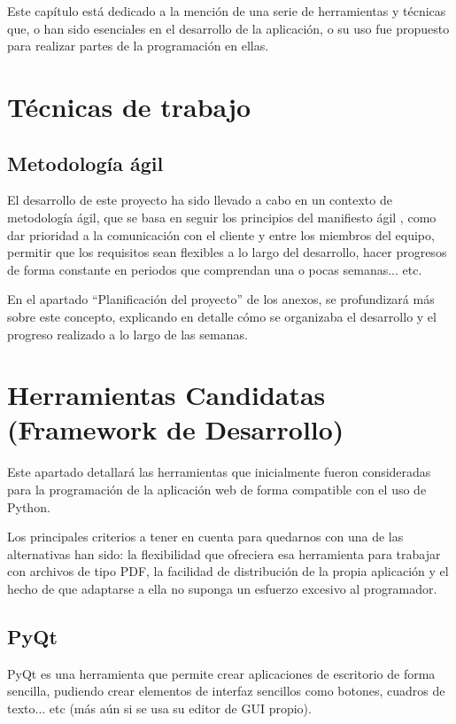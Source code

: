 
Este capítulo está dedicado a la mención de una serie de herramientas y técnicas que, o han sido esenciales en el desarrollo de la aplicación, o su uso fue propuesto para realizar partes de la programación en ellas.

\section{Técnicas de trabajo}

\subsection{Metodología ágil}

El desarrollo de este proyecto ha sido llevado a cabo en un contexto de metodología ágil, que se basa en seguir los principios del manifiesto ágil \cite{fowler2001agile}, como dar prioridad a la comunicación con el cliente y entre los miembros del equipo, permitir que los requisitos sean flexibles a lo largo del desarrollo, hacer progresos de forma constante en periodos que comprendan una o pocas semanas... etc.

En el apartado ``Planificación del proyecto'' de los anexos, se profundizará más sobre este concepto, explicando en detalle cómo se organizaba el desarrollo y el progreso realizado a lo largo de las semanas.

\section{Herramientas Candidatas (Framework de Desarrollo)}
Este apartado detallará las herramientas que inicialmente fueron consideradas para la programación de la aplicación web de forma compatible con el uso de Python.


Los principales criterios a tener en cuenta para quedarnos con una de las alternativas han sido: la flexibilidad que ofreciera esa herramienta para trabajar con archivos de tipo PDF, la facilidad de distribución de la propia aplicación y el hecho de que adaptarse a ella no suponga un esfuerzo excesivo al programador.

\subsection{PyQt}

PyQt es una herramienta \cite{wiki:pyqt} que permite crear aplicaciones de escritorio de forma sencilla, pudiendo crear elementos de interfaz sencillos como botones, cuadros de texto... etc (más aún si se usa su editor de GUI propio).

